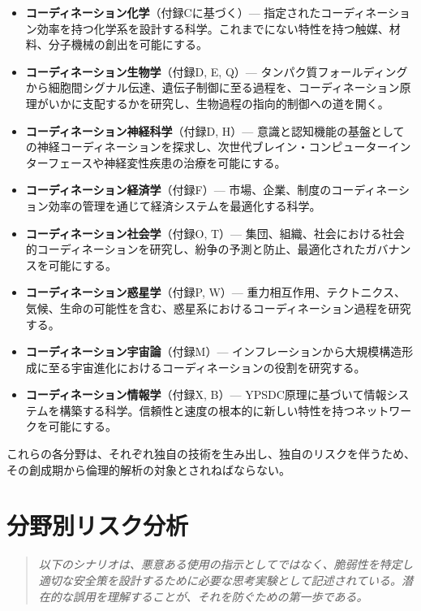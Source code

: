 \documentclass[12pt,a4paper]{article}
\theoremstyle{remark}
\begin{document}
	\begin{itemize}[leftmargin=*]
		\item \textbf{コーディネーション化学}（付録Cに基づく）— 指定されたコーディネーション効率を持つ化学系を設計する科学。これまでにない特性を持つ触媒、材料、分子機械の創出を可能にする。
		
		\item \textbf{コーディネーション生物学}（付録D, E, Q）— タンパク質フォールディングから細胞間シグナル伝達、遺伝子制御に至る過程を、コーディネーション原理がいかに支配するかを研究し、生物過程の指向的制御への道を開く。
		
		\item \textbf{コーディネーション神経科学}（付録D, H）— 意識と認知機能の基盤としての神経コーディネーションを探求し、次世代ブレイン・コンピューターインターフェースや神経変性疾患の治療を可能にする。
		
		\item \textbf{コーディネーション経済学}（付録F）— 市場、企業、制度のコーディネーション効率の管理を通じて経済システムを最適化する科学。
		
		\item \textbf{コーディネーション社会学}（付録O, T）— 集団、組織、社会における社会的コーディネーションを研究し、紛争の予測と防止、最適化されたガバナンスを可能にする。
		
		\item \textbf{コーディネーション惑星学}（付録P, W）— 重力相互作用、テクトニクス、気候、生命の可能性を含む、惑星系におけるコーディネーション過程を研究する。
		
		\item \textbf{コーディネーション宇宙論}（付録M）— インフレーションから大規模構造形成に至る宇宙進化におけるコーディネーションの役割を研究する。
		
		\item \textbf{コーディネーション情報学}（付録X, B）— YPSDC原理に基づいて情報システムを構築する科学。信頼性と速度の根本的に新しい特性を持つネットワークを可能にする。
	\end{itemize}
	
	これらの各分野は、それぞれ独自の技術を生み出し、独自のリスクを伴うため、その創成期から倫理的解析の対象とされねばならない。
	
	\section{分野別リスク分析}
	\label{sec:risks}
	
	\begin{quote}
		\emph{以下のシナリオは、悪意ある使用の指示としてではなく、脆弱性を特定し適切な安全策を設計するために必要な思考実験として記述されている。潜在的な誤用を理解することが、それを防ぐための第一歩である。}
	\end{quote}
	
\end{document}
